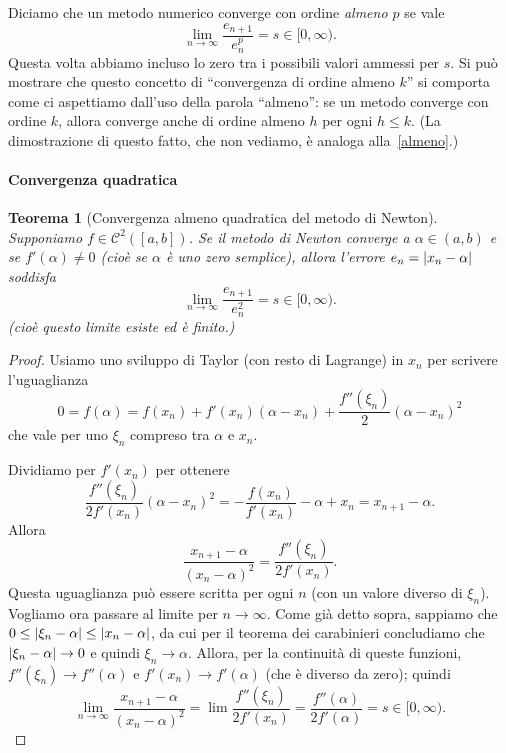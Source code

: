 \documentclass[a4paper]{report}
\DeclarePairedDelimiter{\abs}{\lvert}{\rvert}
\newtheorem{theorem}{Teorema}[chapter]
\theoremstyle{definiton}
\theoremstyle{remark}
\begin{document}
Diciamo che un metodo numerico converge con ordine \emph{almeno $p$} se vale
\[
\lim_{n \to \infty }\frac{e_{n+1}}{e_n^p} = s \in [0,\infty).
\]
Questa volta abbiamo incluso lo zero tra i possibili valori ammessi per $s$. Si può mostrare che questo concetto di ``convergenza di ordine almeno $k$'' si comporta come ci aspettiamo dall'uso della parola ``almeno'': se un metodo converge con ordine $k$, allora converge anche di ordine almeno $h$ per ogni $h\leq k$. (La dimostrazione di questo fatto, che non vediamo, è analoga alla~\eqref{almeno}.)

\paragraph{Convergenza quadratica} \begin{theorem}[Convergenza almeno quadratica del metodo di Newton]\label{thm:convnewton}
Supponiamo $f \in \mathcal{C}^2([a,b])$. Se il metodo di Newton converge a $\alpha \in (a,b)$ e se $f'(\alpha) \neq 0$ (cioè se $\alpha$ è uno \emph{zero semplice}), allora l'errore $e_n = \abs{x_n - \alpha}$ soddisfa
\[
\lim_{n\to \infty} \frac{e_{n+1}}{e_n^2} = s \in [0,\infty).
\]
(cioè questo limite esiste ed è finito.)
\end{theorem}

\begin{proof}
Usiamo uno sviluppo di Taylor (con resto di Lagrange) in $x_n$ per scrivere l'uguaglianza
\[
0 = f(\alpha) = f(x_n) + f'(x_n)(\alpha-x_n) + \frac{f''(\xi_n)}{2}(\alpha-x_n)^2
\]
che vale per uno $\xi_n$ compreso tra $\alpha$ e $x_n$.

Dividiamo per $f'(x_n)$ per ottenere
\[
\frac{f''(\xi_n)}{2f'(x_n)}(\alpha-x_n)^2 = - \frac{f(x_n)}{f'(x_n)} - \alpha + x_n   =  x_{n+1} - \alpha.
\]
Allora
\[
\frac{x_{n+1} - \alpha}{(x_n-\alpha)^2} = \frac{f''(\xi_n)}{2f'(x_n)}.
\]
Questa uguaglianza può essere scritta per ogni $n$ (con un valore diverso di $\xi_n$). Vogliamo ora passare al limite per $n \to \infty$. Come già detto sopra, sappiamo che $0 \leq \abs{\xi_n - \alpha} \leq \abs{x_n - \alpha}$, da cui per il teorema dei carabinieri concludiamo che $\abs{\xi_n - \alpha} \to 0$ e quindi $\xi_n \to \alpha$. Allora, per la continuità di queste funzioni, $f''(\xi_n) \to f''(\alpha)$ e $f'(x_n) \to f'(\alpha)$ (che è diverso da zero); quindi
\[
\lim_{n\to\infty} \frac{x_{n+1} - \alpha}{(x_n-\alpha)^2} = \lim \frac{f''(\xi_n)}{2f'(x_n)} = \frac{f''(\alpha)}{2f'(\alpha)} = s \in [0,\infty).
\]
\end{proof}
\end{document}
